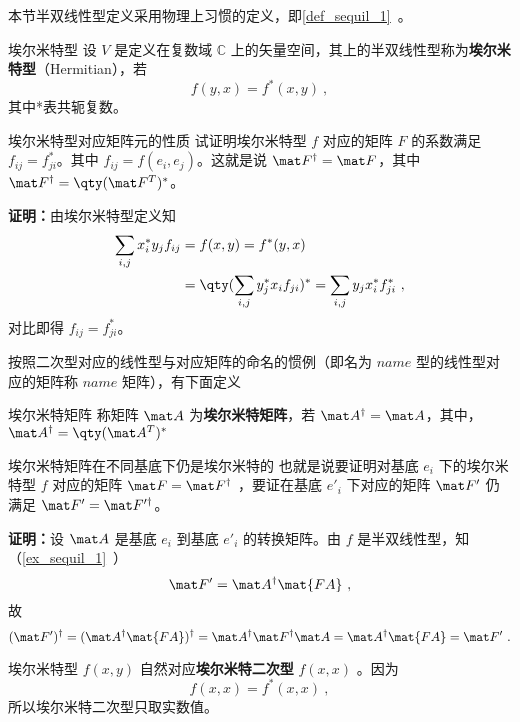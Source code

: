 本节半双线性型定义采用物理上习惯的定义，即\autoref{def_sequil_1}~。
\begin{definition}{埃尔米特型}
设 $V$ 是定义在复数域 $\mathbb{C}$ 上的矢量空间，其上的半双线性型称为\textbf{埃尔米特型}（Hermitian），若
\begin{equation}\label{eq_HeFor_2}
f(   y,   x)=f^*(   x,   y)~,
\end{equation}
其中*表共轭复数。
\end{definition}
\begin{example}{埃尔米特型对应矩阵元的性质}
试证明埃尔米特型 $f$ 对应的矩阵 $F$ 的系数满足 $f_{ij}=f_{ji}^*$。其中 $f_{ij}=f(   e_i,   e_j)$。这就是说 $\mat F^\dagger=\mat F$，其中 $\mat F^\dagger=\qty(\mat F^T)^*$。

\textbf{证明：}由埃尔米特型定义知
\begin{equation}
\begin{aligned}
\sum_{i,j}x_i^*y_j f_{ij}&=f(   x,   y)=f^*(   y,   x)\\
&=\qty(\sum_{i,j}y_j^* x_i f_{ji})^*=\sum_{i,j}y_j x_i^*f_{ji}^*~,
\end{aligned}
\end{equation}
对比即得 $f_{ij}=f_{ji}^*$。
\end{example}
按照二次型对应的线性型与对应矩阵的命名的惯例（即名为 $name$ 型的线性型对应的矩阵称 $name$ 矩阵），有下面定义
\begin{definition}{埃尔米特矩阵}
称矩阵 $\mat A$ 为\textbf{埃尔米特矩阵}，若 $\mat A^\dagger=\mat A$，其中，$\mat A^\dagger=\qty(\mat A^T)^*$
\end{definition}
\begin{example}{埃尔米特矩阵在不同基底下仍是埃尔米特的}
也就是说要证明对基底 $   e_i$ 下的埃尔米特型 $f$ 对应的矩阵 $\mat F=\mat F^\dagger$ ，要证在基底 $   e'_i$ 下对应的矩阵 $\mat F'$ 仍满足 $\mat F'=\mat F'^\dagger$。

\textbf{证明：}设 $\mat A$ 是基底 $  e_i$ 到基底 $   e'_i$ 的转换矩阵。由 $f$ 是半双线性型，知（\autoref{ex_sequil_1}~）
\begin{equation}
\mat F'=\mat A^\dagger \mat{FA}~,
\end{equation}
 故
\begin{equation}
(\mat F')^\dagger=(\mat A^\dagger \mat{FA})^\dagger=\mat A^\dagger \mat F^\dagger \mat A=\mat A^\dagger \mat{FA}=\mat F'~.
\end{equation}
\end{example}
埃尔米特型 $f(   x,   y)$ 自然对应\textbf{埃尔米特二次型} $f(   x,   x)$ 。因为
\begin{equation}
 f(   x,   x)= f^*(   x,   x) ~,
\end{equation}
所以埃尔米特二次型只取实数值。

